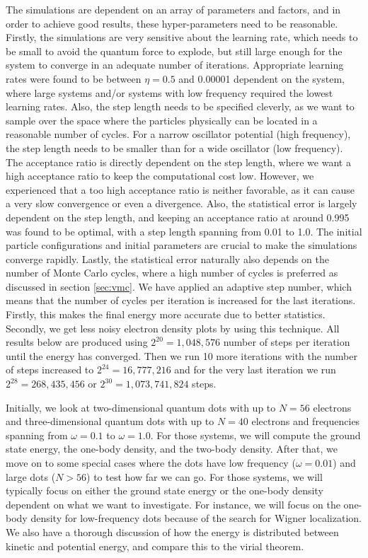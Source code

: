 The simulations are dependent on an array of parameters and factors, and in order to achieve good results, these hyper-parameters need to be reasonable. Firstly, the simulations are very sensitive about the learning rate, which needs to be small to avoid the quantum force to explode, but still large enough for the system to converge in an adequate number of iterations. Appropriate learning rates were found to be between $\eta=0.5$ and 0.00001 dependent on the system, where large systems and/or systems with low frequency required the lowest learning rates. Also, the step length needs to be specified cleverly, as we want to sample over the space where the particles physically can be located in a reasonable number of cycles. For a narrow oscillator potential (high frequency), the step length needs to be smaller than for a wide oscillator (low frequency). The acceptance ratio is directly dependent on the step length, where we want a high acceptance ratio to keep the computational cost low. However, we experienced that a too high acceptance ratio is neither favorable, as it can cause a very slow convergence or even a divergence. Also, the statistical error is largely dependent on the step length, and keeping an acceptance ratio at around 0.995 was found to be optimal, with a step length spanning from 0.01 to 1.0. The initial particle configurations and initial parameters are crucial to make the simulations converge rapidly. Lastly, the statistical error naturally also depends on the number of Monte Carlo cycles, where a high number of cycles is preferred as discussed in section \ref{sec:vmc}. We have applied an adaptive step number, which means that the number of cycles per iteration is increased for the last iterations. Firstly, this makes the final energy more accurate due to better statistics. Secondly, we get less noisy electron density plots by using this technique. All results below are produced using $2^{20}=1,048,576$ number of steps per iteration until the energy has converged. Then we run 10 more iterations with the number of steps increased to $2^{24}=16,777,216$ and for the very last iteration we run $2^{28}=268,435,456$ or $2^{30}=1,073,741,824$ steps.

Initially, we look at two-dimensional quantum dots with up to $N=56$ electrons and three-dimensional quantum dots with up to $N=40$ electrons and frequencies spanning from  $\omega=0.1$ to $\omega=1.0$. For those systems, we will compute the ground state energy, the one-body density, and the two-body density. After that, we move on to some special cases where the dots have low frequency ($\omega=0.01$) and large dots ($N>56$) to test how far we can go. For those systems, we will typically focus on either the ground state energy or the one-body density dependent on what we want to investigate. For instance, we will focus on the one-body density for low-frequency dots because of the search for Wigner localization. We also have a thorough discussion of how the energy is distributed between kinetic and potential energy, and compare this to the virial theorem.

